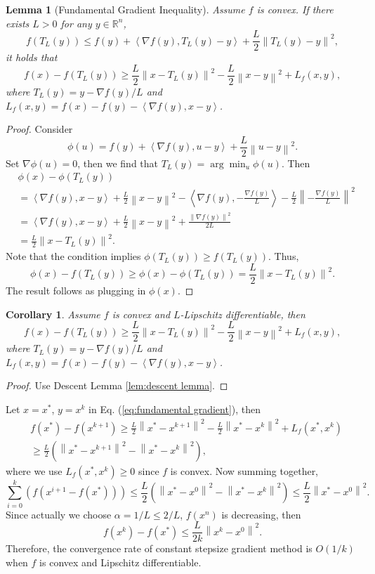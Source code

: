 \documentclass[12pt,a4paper]{report}
\numberwithin{equation}{section}
\theoremstyle{mystyle}
\newtheorem{lemma}[definition]{Lemma}
\newtheorem{corollary}[definition]{Corollary}
\newcommand{\R}{\mathbb{R}}
\newcommand{\grad}{\nabla}
\newcommand{\norm}[1]{\left\lVert #1 \right\rVert}
\newcommand{\inner}[1]{\left\langle #1 \right\rangle}
\begin{document}
	\begin{lemma}[Fundamental Gradient Inequality]
		Assume $f$ is convex. If there exists $L>0$ for any $y\in \R^n$,
		$$
		f(T_L(y))\leq f(y)+\inner{\grad f(y),T_L(y)-y}+\frac{L}{2}\norm{T_L(y)-y}^2,
		$$
		it holds that
		\begin{equation}
			f(x)-f(T_L(y))\geq \frac{L}{2}\norm{x-T_L(y)}^2-\frac{L}{2}\norm{x-y}^2+L_f(x,y),\label{eq:fundamental gradient}
		\end{equation}
		where $T_L(y)=y-\grad f(y)/L$ and $L_f(x,y)=f(x)-f(y)-\inner{\grad f(y),x-y}$.
	\end{lemma}
	\begin{proof}
		Consider 
		$$\phi(u)=f(y)+\inner{\grad f(y),u-y}+\frac{L}{2}\norm{u-y}^2.$$ 
		Set $\grad \phi(u)=0$, then
		we find that $T_L(y)=\arg\min_u \phi(u)$.
		Then
		\begin{align*}
			&\phi(x)-\phi(T_L(y))\\
			&=\inner{\grad f(y),x-y}+\frac{L}{2}\norm{x-y}^2-\inner{\grad f(y),-\frac{\grad f(y)}{L}}-\frac{L}{2}\norm{-\frac{\grad f(y)}{L}}^2\\
			&=\inner{\grad f(y),x-y}+\frac{L}{2}\norm{x-y}^2+\frac{\norm{\grad f(y)}^2}{2L}\\
			&=\frac{L}{2}\norm{x-T_L(y)}^2.
		\end{align*}
		Note that the condition implies $\phi(T_L(y))\geq f(T_L(y))$. Thus, 
		$$\phi(x)-f(T_L(y))\geq \phi(x)-\phi(T_L(y))=\frac{L}{2}\norm{x-T_L(y)}^2.$$
		The result follows as plugging in $\phi(x)$.
	\end{proof}

	\begin{corollary}
		Assume $f$ is convex and $L$-Lipschitz differentiable, then
		\begin{equation*}
			f(x)-f(T_L(y))\geq \frac{L}{2}\norm{x-T_L(y)}^2-\frac{L}{2}\norm{x-y}^2+L_f(x,y),
		\end{equation*}
		where $T_L(y)=y-\grad f(y)/L$ and $L_f(x,y)=f(x)-f(y)-\inner{\grad f(y),x-y}$.
	\end{corollary}
	\begin{proof}
		Use Descent Lemma \ref{lem:descent lemma}.
	\end{proof}
	
	
	Let $x=x^*$, $y=x^k$ in Eq. (\ref{eq:fundamental gradient}), then 
	\begin{equation}\label{eq:fundamental gradient plug in}
		\begin{split}
			&f(x^*)-f(x^{k+1})\geq \frac{L}{2}\norm{x^*-x^{k+1}}^2-\frac{L}{2}\norm{x^*-x^k}^2+L_f(x^*,x^k)\\
			&\geq \frac{L}{2}(\norm{x^*-x^{k+1}}^2-\norm{x^*-x^k}^2),
		\end{split}
	\end{equation}
	where we use $L_f(x^*,x^k)\geq 0$ since $f$ is convex. Now summing together,
	$$
	\sum_{i=0}^{k}(f(x^{i+1}-f(x^*)))\leq \frac{L}{2}(\norm{x^*-x^0}^2-\norm{x^*-x^k}^2)\leq \frac{L}{2}\norm{x^*-x^0}^2.
	$$
	Since actually we choose $\alpha=1/L\leq 2/L$, $f(x^n)$ is decreasing, then
	$$
	f(x^k)-f(x^*)\leq \frac{L}{2k}\norm{x^k-x^0}^2.
	$$
	Therefore, the convergence rate of constant stepsize gradient method is $O(1/k)$ when $f$ is convex and Lipschitz differentiable.
	
\end{document}
